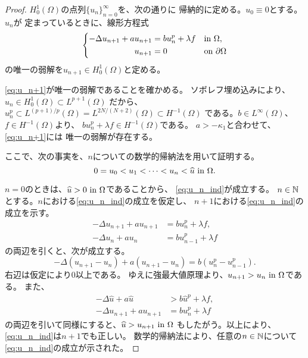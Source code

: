 \begin{proof}
 $H_0^1(\Omega)$の点列$\{ u_n \}_{n=0}^\infty$を、次の通りに
 帰納的に定める。$u_0 \equiv 0$とする。$u_n$が
 定まっているときに、線形方程式
  \begin{align}
   \left\{
   \begin{aligned}
    -\Delta u_{n+1} + a u_{n+1} 
    &= b u_n^p + \lambda f  & &\text{in}~ \Omega,  \\
    u_{n+1} &= 0 & &\text{on}~ \partial\Omega
   \end{aligned}
   \right. \label{eq:u_n+1}
  \end{align}
 の唯一の弱解を$u_{n+1} \in H_0^1(\Omega)$と定める。
 
 \eqref{eq:u_n+1}が唯一の弱解であることを確かめる。
 ソボレフ埋め込みにより、
 $
  u_n \in H_0^1(\Omega) \subset L^{p+1}(\Omega)
 $
 だから、
 $
  u_n^p \subset L^{(p+1)/p}(\Omega)
 = L^{2N/(N+2)}(\Omega) \subset H^{-1}(\Omega)
 $
 である。$b \in L^\infty(\Omega)$、$f \in H^{-1}(\Omega)$より、
 $b u_n^p + \lambda f \in H^{-1}(\Omega)$である。
 $a > -\kappa_1$と合わせて、\eqref{eq:u_n+1}には
 唯一の弱解が存在する。

 ここで、次の事実を、$n$についての数学的帰納法を用いて証明する。
 \begin{equation}
  0 = u_0 < u_1 < \dots < u_n < \widehat{u} ~\text{in}~ \Omega. \label{eq:u_n_ind}
 \end{equation}

 $n = 0$のときは、$\widehat{u} > 0 ~\text{in}~ \Omega$であることから、
 \eqref{eq:u_n_ind}が成立する。
 $n \in \mathbb{N}$とする。$n$における\eqref{eq:u_n_ind}の成立を仮定し、
 $n+1$における\eqref{eq:u_n_ind}の成立を示す。
 \begin{align*}
  -\Delta u_{n+1} + a u_{n+1} &= b u_n^p + \lambda f, \\
  -\Delta u_{n} + a u_{n} &= b u_{n-1}^p + \lambda f
 \end{align*}
 の両辺を引くと、次が成立する。
 \[
  -\Delta (u_{n+1} - u_n) + a(u_{n+1} - u_n) 
 = b(u_n^p - u_{n-1}^p).
 \]
 右辺は仮定により$0$以上である。
 ゆえに強最大値原理より、$u_{n+1} > u_n ~\text{in}~\Omega$である。
 また、
 \begin{align*}
  -\Delta \hat{u} + a \hat{u} &> b \hat{u}^p + \lambda f, \\
  -\Delta u_{n+1} + a u_{n+1} &= b u_{n}^p + \lambda f
 \end{align*}
 の両辺を引いて同様にすると、$\widehat{u} > u_{n+1} ~\text{in}~\Omega$
 もしたがう。以上により、\eqref{eq:u_n_ind}は$n+1$でも正しい。
 数学的帰納法により、任意の$n \in \mathbb{N}$について
 \eqref{eq:u_n_ind}の成立が示された。


\end{proof}
